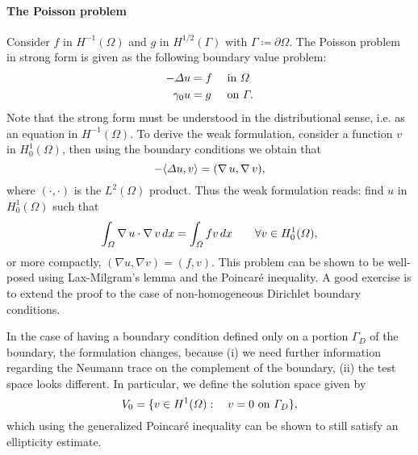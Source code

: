\paragraph{The Poisson problem} Consider $f$ in $H^{-1}(\Omega)$ and $g$ in $H^{1/2}(\Gamma)$ with $\Gamma\coloneqq \partial\Omega$. The Poisson problem in strong form is given as the following boundary value problem: 
\begin{equation*}
    \begin{aligned}
        -\Delta u  &= f &&\text{ in }\Omega\\
        \gamma_0 u &= g &&\text{ on }\Gamma.
    \end{aligned}
\end{equation*}
Note that the strong form must be understood in the distributional sense, i.e. as an equation in $H^{-1}(\Omega)$. To derive the weak formulation, consider a function $v$ in $H_0^1(\Omega)$, then using the boundary conditions we obtain that 
\begin{equation}
    -\langle \Delta u,v\rangle = (\operatorname{\nabla} u, \operatorname{\nabla} v),
\end{equation}
where $(\cdot, \cdot)$ is the $L^2(\Omega)$ product. Thus the weak formulation reads: find $u$ in $H_0^1(\Omega)$ such that 
\begin{equation}
    \int_\Omega \operatorname{\nabla} u\cdot \operatorname{\nabla} v\,dx = \int_\Omega fv\, dx \qquad \forall v\in H_0^1(\Omega),
\end{equation}
or more compactly, $(\nabla u, \nabla v) = (f, v)$. This problem can be shown to be well-posed using Lax-Milgram's lemma and the Poincaré inequality. A good exercise is to extend the proof to the case of non-homogeneous Dirichlet boundary conditions.

In the case of having a boundary condition defined only on a portion $\Gamma_D$ of the boundary, the formulation changes, because (i) we need further information regarding the Neumann trace on the complement of the boundary, (ii) the test space looks different. In particular, we define the solution space given by 
\begin{equation}\label{eq:def-V0}
    V_0 = \{v\in H^1(\Omega): \quad v = 0 \text{ on } \Gamma_D\},
\end{equation}
which using the generalized Poincaré inequality can be shown to still satisfy an ellipticity estimate. 

